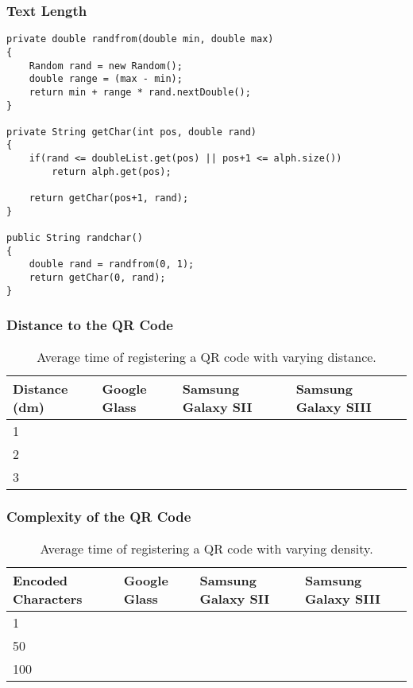 

\subsubsection{Text Length}
\begin{lstlisting}
private double randfrom(double min, double max)
{
	Random rand = new Random();
	double range = (max - min);
	return min + range * rand.nextDouble();
}

private String getChar(int pos, double rand)
{
	if(rand <= doubleList.get(pos) || pos+1 <= alph.size())
		return alph.get(pos);
		
	return getChar(pos+1, rand);
}

public String randchar()
{
	double rand = randfrom(0, 1);
	return getChar(0, rand);
}
\end{lstlisting}

\subsubsection{Distance to the QR Code}

	\begin{table}[ht!]
    		\caption{Average time of registering a QR code with varying distance.} \label{tab:distanceAverage}
		\centering \begin{tabularx}{\textwidth}{l|X|X|X} \hline
		\textbf{Distance (dm)} & \textbf{Google Glass} & \textbf{Samsung Galaxy SII} & \textbf{Samsung Galaxy SIII} \\ \hline \hline
       
		1	&	&	&	\\ \hline
		2	&	&	&	\\ \hline
		3	&	&	&	\\ \hline
		
		\end{tabularx}
	\end{table}

\subsubsection{Complexity of the QR Code}

	\begin{table}[H]%
    		\caption{Average time of registering a QR code with varying density.} \label{tab:complexityAverage}
		\centering \begin{tabularx}{\textwidth}{l|X|X|X} \hline
		\textbf{Encoded Characters} & \textbf{Google Glass} & \textbf{Samsung Galaxy SII} & \textbf{Samsung Galaxy SIII} \\ \hline \hline
       
		1	&	&	&	\\ \hline
		50	&	&	&	\\ \hline
		100	&	&	&	\\ \hline
		
		\end{tabularx}
	\end{table}


